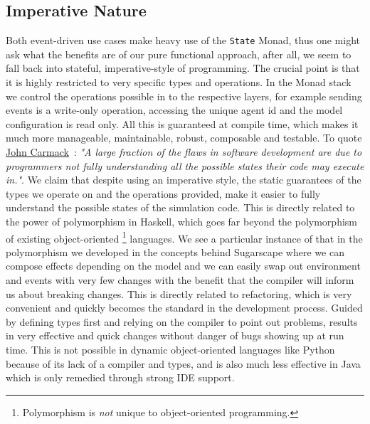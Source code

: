 \subsection{Imperative Nature}
Both event-driven use cases make heavy use of the \texttt{State} Monad, thus one might ask what the benefits are of our pure functional approach, after all, we seem to fall back into stateful, imperative-style of programming.
The crucial point is that it is highly restricted to very specific types and operations. In the Monad stack we control the operations possible in to the respective layers, for example sending events is a write-only operation, accessing the unique agent id and the model configuration is read only. All this is guaranteed at compile time, which makes it much more manageable, maintainable, robust, composable and testable.
To quote \href{https://www.gamasutra.com/view/news/169296/Indepth_Functional_programming_in_C.php}{John Carmack}~\cite{gamasutra_carmack_fp}: \emph{"A large fraction of the flaws in software development are due to programmers not fully understanding all the possible states their code may execute in."}. We claim that despite using an imperative style, the static guarantees of the types we operate on and the operations provided, make it easier to fully understand the possible states of the simulation code.
This is directly related to the power of polymorphism in Haskell, which goes far beyond the polymorphism of existing object-oriented \footnote{Polymorphism is \textit{not} unique to object-oriented programming.} languages.
We see a particular instance of that in the polymorphism we developed in the concepts behind Sugarscape where we can compose effects depending on the model and we can easily swap out environment and events with very few changes with the benefit that the compiler will inform us about breaking changes. This is directly related to refactoring, which is very convenient and quickly becomes the standard in the development process. Guided by defining types first and relying on the compiler to point out problems, results in very effective and quick changes without danger of bugs showing up at run time. This is not possible in dynamic object-oriented languages like Python because of its lack of a compiler and types, and is also much less effective in Java which is only remedied through strong IDE support.

